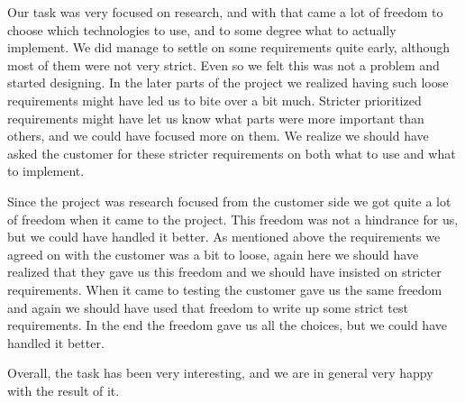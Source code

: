 Our task was very focused on research, and with that came a lot of freedom to choose which technologies to use, and to some degree what to actually implement. We did manage to settle on some requirements quite early, although most of them were not very strict. Even so we felt this was not a problem and started designing. In the later parts of the project we realized having such loose requirements might have led us to bite over a bit much. Stricter prioritized requirements might have let us know what parts were more important than others, and we could have focused more on them. We realize we should have asked the customer for these stricter requirements on both what to use and what to implement.

Since the project was research focused from the customer side we got quite a lot of freedom when it came to the project. This freedom was not a hindrance for us, but we could have handled it better. As mentioned above the requirements we agreed on with the customer was a bit to loose, again here we should have realized that they gave us this freedom and we should have insisted on stricter requirements. When it came to testing the customer gave us the same freedom and again we should have used that freedom to write up some strict test requirements. In the end the freedom gave us all the choices, but we could have handled it better.

Overall, the task has been very interesting, and we are in general very happy with the result of it.
